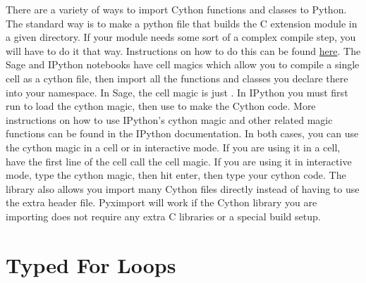 There are a variety of ways to import Cython functions and classes to Python.
The standard way is to make a python file that builds the C extension module in a given directory.
If your module needs some sort of a complex compile step, you will have to do it that way.
Instructions on how to do this can be found \href{http://docs.cython.org/src/reference/compilation.html}{here}.
The Sage and IPython notebooks have cell magics which allow you to compile a single cell as a cython file, then import all the functions and classes you declare there into your namespace.
In Sage, the cell magic is just .
In IPython you must first run  to load the cython magic, then use  to make the Cython code.
More instructions on how to use IPython's cython magic and other related magic functions can be found in the IPython documentation.
In both cases, you can use the cython magic in a cell or in interactive mode.
If you are using it in a cell, have the first line of the cell call the cell magic.
If you are using it in interactive mode, type the cython magic, then hit enter, then type your cython code.
The library  also allows you import many Cython files directly instead of having to use the extra header file.
Pyximport will work if the Cython library you are importing does not require any extra C libraries or a special build setup.

\section*{Typed For Loops}

